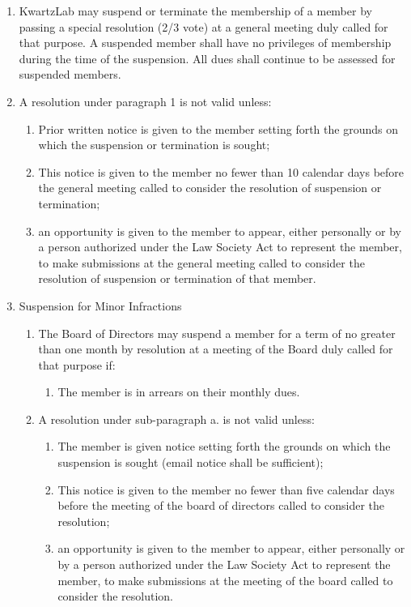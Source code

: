 \documentclass{article}
\begin{document}
\begin{enumerate}
\item KwartzLab may suspend or terminate the membership of a member by passing a special resolution (2/3 vote) at a general meeting duly called for that purpose. A suspended member shall have no privileges of membership during the time of the suspension. All dues shall continue to be assessed for suspended members.
\item A resolution under paragraph 1 is not valid unless:
	\begin{enumerate}
	\item Prior written notice is given to the member setting forth the grounds on which the suspension or termination is sought;
	\item This notice is given to the member no fewer than 10 calendar days before the general meeting called to consider the resolution of suspension or termination;
	\item an opportunity is given to the member to appear, either personally or by a person authorized under the Law Society Act to represent the member, to make submissions at the general meeting called to consider the resolution of suspension or termination of that member.
	\end{enumerate}
\item Suspension for Minor Infractions
	\begin{enumerate}
	\item The Board of Directors may suspend a member for a term of no greater than one month by resolution at a meeting of the Board duly called for that purpose if:
		\begin{enumerate}
		\item The member is in arrears on their monthly dues.
		\end{enumerate}
	\item A resolution under sub-paragraph a. is not valid unless:
		\begin{enumerate}
		\item The member is given notice setting forth the grounds on which the suspension is sought (email notice shall be sufficient);
		\item This notice is given to the member no fewer than five calendar days before the meeting of the board of directors called to consider the resolution;
		\item an opportunity is given to the member to appear, either personally or by a person authorized under the Law Society Act to represent the member, to make submissions at the meeting of the board called to consider the resolution.

\end{enumerate}
\end{enumerate}
\end{enumerate}
\end{document}
